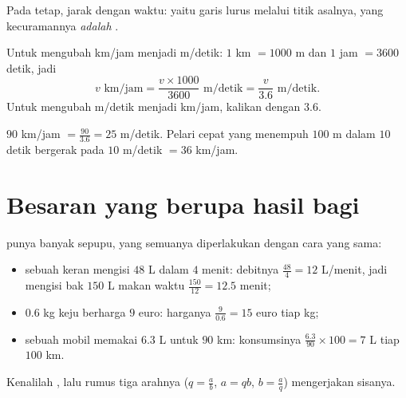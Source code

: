 \begin{omfigure}

{\small Pada  tetap, jarak  dengan waktu: yaitu
garis lurus melalui titik asalnya, yang kecuramannya \emph{adalah}
.}
\end{omfigure}

\begin{method}\label{met:g8:speed:convert}
Untuk mengubah km/jam menjadi m/detik: $1$ km $= 1000$ m dan
$1$ jam $= 3600$ detik, jadi
\[
v \text{ km/jam} = \frac{v \times 1000}{3600} \text{ m/detik}
= \frac{v}{3.6} \text{ m/detik}.
\]
Untuk mengubah m/detik menjadi km/jam, kalikan dengan $3.6$.
\end{method}

\begin{example}\label{ex:g8:speed:convert}
$90$ km/jam $= \frac{90}{3.6} = 25$ m/detik. Pelari cepat yang
menempuh $100$ m dalam $10$ detik bergerak pada $10$ m/detik
$= 36$ km/jam.
\end{example}

\section{Besaran yang berupa hasil bagi}

\begin{example}\label{ex:g8:speed:quotients}
 punya banyak sepupu, yang semuanya diperlakukan dengan cara
yang sama:
\begin{itemize}
  \item sebuah keran mengisi $48$ L dalam $4$ menit: debitnya
        $\frac{48}{4} = 12$ L/menit, jadi mengisi bak $150$ L makan
        waktu $\frac{150}{12} = 12.5$ menit;
  \item $0.6$ kg keju berharga $9$ euro: harganya
        $\frac{9}{0.6} = 15$ euro tiap kg;
  \item sebuah mobil memakai $6.3$ L untuk $90$ km: konsumsinya
        $\frac{6.3}{90} \times 100 = 7$ L tiap $100$ km.
\end{itemize}
Kenalilah , lalu rumus tiga arahnya
($q = \frac ab$, $a = qb$, $b = \frac aq$) mengerjakan sisanya.
\end{example}

